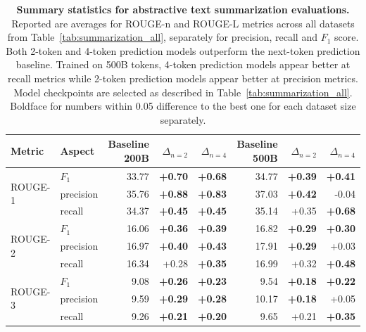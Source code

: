 \documentclass{article}
\theoremstyle{plain}
\theoremstyle{definition}
\theoremstyle{remark}
\begin{document}
\begin{table}[ht!]
\centering
\caption{\textbf{Summary statistics for abstractive text summarization evaluations.} 
Reported are averages for ROUGE-n and ROUGE-L metrics across all datasets from Table~\ref{tab:summarization_all}, separately for precision, recall and $F_1$ score. Both 2-token and 4-token prediction models outperform the next-token prediction baseline. Trained on 500B tokens, 4-token prediction models appear better at recall metrics while 2-token prediction models appear better at precision metrics. Model checkpoints are selected as described in Table~\ref{tab:summarization_all}. Boldface for numbers within 0.05 difference to the best one for each dataset size separately.}
\label{tab:summarization_avgs}
\begin{tabular}{llrrrrrr}
\toprule
Metric & Aspect & Baseline 200B & $\Delta_{n=2}$ & $\Delta_{n=4}$ & Baseline 500B & $\Delta_{n=2}$ & $\Delta_{n=4}$ \\
\midrule
\multirow{3}{*}{ROUGE-1} & $F_1$ &  33.77 &         \textbf{+0.70} &         \textbf{+0.68} &  34.77 &         \textbf{+0.39} &         \textbf{+0.41} \\
           & precision &  35.76 &         \textbf{+0.88} &         \textbf{+0.83} &  37.03 &         \textbf{+0.42} &        -0.04 \\
           & recall &  34.37 &         \textbf{+0.45} &         \textbf{+0.45} &  35.14 &         +0.35 &         \textbf{+0.68} \\
\midrule
\multirow{3}{*}{ROUGE-2} & $F_1$ &  16.06 &         \textbf{+0.36} &         \textbf{+0.39} &  16.82 &         \textbf{+0.29} &         \textbf{+0.30} \\
           & precision &  16.97 &         \textbf{+0.40} &         \textbf{+0.43} &  17.91 &         \textbf{+0.29} &         +0.03 \\
           & recall &  16.34 &         +0.28 &         \textbf{+0.35} &  16.99 &         +0.32 &         \textbf{+0.48} \\
\midrule
\multirow{3}{*}{ROUGE-3} & $F_1$ &   9.08 &         \textbf{+0.26} &         \textbf{+0.23} &   9.54 &         \textbf{+0.18} &         \textbf{+0.22} \\
           & precision &   9.59 &         \textbf{+0.29} &         \textbf{+0.28} &  10.17 &         \textbf{+0.18} &         +0.05 \\
           & recall &   9.26 &         \textbf{+0.21} &         \textbf{+0.20} &   9.65 &         +0.21 &         \textbf{+0.35} \\

\end{tabular}
\end{table}
\end{document}
